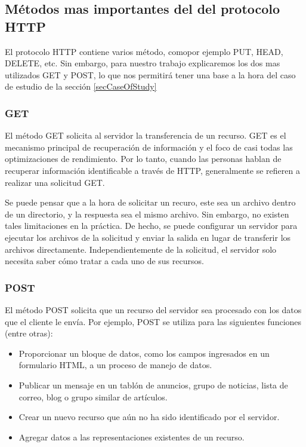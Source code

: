 \subsection{Métodos mas importantes del del protocolo HTTP}

El protocolo HTTP contiene varios método, comopor ejemplo PUT, HEAD, DELETE, etc. Sin
embargo, para nuestro trabajo explicaremos los dos mas utilizados GET y POST, lo que
nos permitirá tener una base a la hora del caso de estudio de la 
sección \ref{secCaseOfStudy}


\subsubsection*{GET}

El método GET solicita al servidor la transferencia de un recurso.
GET es el mecanismo principal de recuperación de información y el 
foco de casi todas las optimizaciones de rendimiento. Por lo tanto,
cuando las personas hablan de recuperar información identificable
a través de HTTP, generalmente se refieren a realizar una solicitud
GET.

Se puede pensar que a la hora de solicitar un recuro, este sea un archivo 
dentro de un directorio, y la respuesta sea el mismo archivo. Sin embargo, 
no existen tales limitaciones en la práctica. De hecho, se puede 
configurar un servidor para ejecutar los archivos de la solicitud y 
enviar la salida en lugar de transferir los archivos directamente. 
Independientemente de la solicitud, el servidor solo necesita saber 
cómo tratar a cada uno de sus recursos.

\subsubsection*{POST}

El método POST solicita que un recurso del servidor sea procesado con 
los datos que el cliente le envía. Por ejemplo, POST se utiliza para 
las siguientes funciones (entre otras):

\begin{itemize}
   \item Proporcionar un bloque de datos, como los campos ingresados 
   en un formulario HTML, a un proceso de manejo de datos.
   \item Publicar un mensaje en un tablón de anuncios, grupo de 
   noticias, lista de correo, blog o grupo similar de artículos.
   \item Crear un nuevo recurso que aún no ha sido identificado por 
   el servidor.
   \item Agregar datos a las representaciones existentes de un recurso.
\end{itemize}


